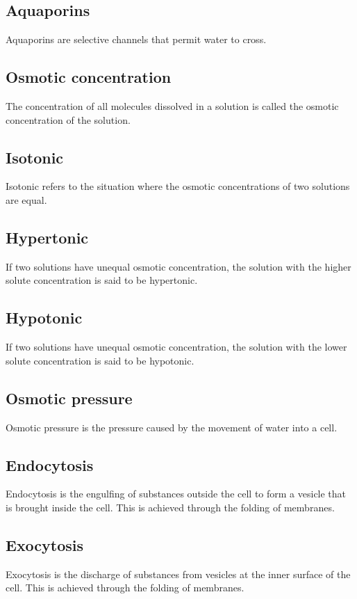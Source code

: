 \documentclass[11pt]{article}
\begin{document}
\subsection{Aquaporins}
\label{sec:org155e6a1}
Aquaporins are selective channels that permit water to cross.
\subsection{Osmotic concentration}
\label{sec:org01eca10}
The concentration of all molecules dissolved in a solution is called the osmotic concentration of the solution.
\subsection{Isotonic}
\label{sec:org36824dd}
Isotonic refers to the situation where the osmotic concentrations of two solutions are equal.
\subsection{Hypertonic}
\label{sec:org2861516}
If two solutions have unequal osmotic concentration, the solution with the higher solute concentration is said to be hypertonic.
\subsection{Hypotonic}
\label{sec:org7ebcb9b}
If two solutions have unequal osmotic concentration, the solution with the lower solute concentration is said to be hypotonic.
\subsection{Osmotic pressure}
\label{sec:orgd2f4388}
Osmotic pressure is the pressure caused by the movement of water into a cell.
\subsection{Endocytosis}
\label{sec:orgdf47731}
Endocytosis is the engulfing of substances outside the cell to form a vesicle that is brought inside the cell. This is achieved through the folding of membranes.
\subsection{Exocytosis}
\label{sec:orgdaf863a}
Exocytosis is the discharge of substances from vesicles at the inner surface of the cell. This is achieved through the folding of membranes.
\end{document}
